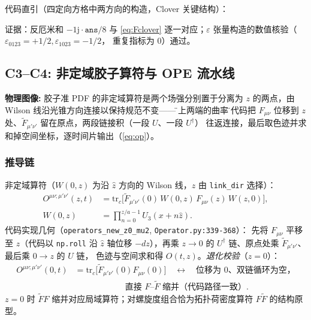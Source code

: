 \documentclass[UTF8]{ctexart}
\begin{document}
代码直引（四定向方格中两方向的构造，Clover 关键结构）：


\textcolor{evidence}{证据}：反厄米和 $-1\mathrm j\cdot\texttt{ans}/8$ 与 \eqref{eq:Fclover}
逐一对应；$\varepsilon$ 张量构造的数值核验（$\varepsilon_{0123}=+1/2,\varepsilon_{1023}=-1/2$，
重复指标为 0）通过。

\subsection{C3--C4: 非定域胶子算符与 OPE 流水线}
\begin{physbox}
\textbf{物理图像:} 胶子准 PDF 的非定域算符是两个场强分别置于分离为 $z$ 的两点，由
Wilson 线沿光锥方向连接以保持规范不变——\"弦上两端的曲率\"。代码把 $F_{\mu\nu}$ 位移到
$z$ 处、$\widetilde F_{\mu'\nu'}$ 留在原点，两段链接积（一段 $U$、一段 $U^\dagger$）
往返连接，最后取色迹并求和掉空间坐标，逐时间片输出（\eqref{eq:op}）。
\end{physbox}

\subsubsection{推导链}
非定域算符（$W(0,z)$ 为沿 $\hat z$ 方向的 Wilson 线，$\hat z$ 由 \texttt{link\_dir} 选择）：
\begin{equation}\label{eq:op}
\begin{aligned}
O^{\mu\nu;\mu'\nu'}(z,t)
&=\mathrm{tr}_c\Big[\widetilde F_{\mu'\nu'}(0)\,W(0,z)\,F_{\mu\nu}(z)\,W(z,0)\Big],\\
W(0,z)&=\prod_{n=0}^{z/a-1}U_3(x+n\hat z).
\end{aligned}
\end{equation}
代码实现几何（\texttt{operators\_new\_z0\_mu2}, \texttt{\nolinkurl{Operator.py:339-368}}）：
先将 $F_{\mu\nu}$ 平移至 $z$（代码以 \texttt{np.roll} 沿 $\hat z$ 轴位移 $-dz$），再乘
$z\to 0$ 的 $U^\dagger$ 链、原点处乘 $\widetilde F_{\mu'\nu'}$、最后乘 $0\to z$ 的 $U$ 链，
色迹与空间求和得 $O(t,z)$。\emph{退化校验}（$z=0$）：
\begin{align}\label{eq:opz0}
O^{\mu\nu;\mu'\nu'}(0,t)&=\mathrm{tr}_c\big[\widetilde F_{\mu'\nu'}(0)F_{\mu\nu}(0)\big]
\quad\longleftrightarrow\quad \text{位移为 0、双链循环为空，}\\
&\qquad\qquad\qquad\text{直接 $F$--$\widetilde F$ 缩并（代码路径一致）}.
\end{align}
$z=0$ 时 $\widetilde F F$ 缩并对应局域算符；对螺旋度组合恰为拓扑荷密度算符
$F\widetilde F$ 的结构原型。
\end{document}
